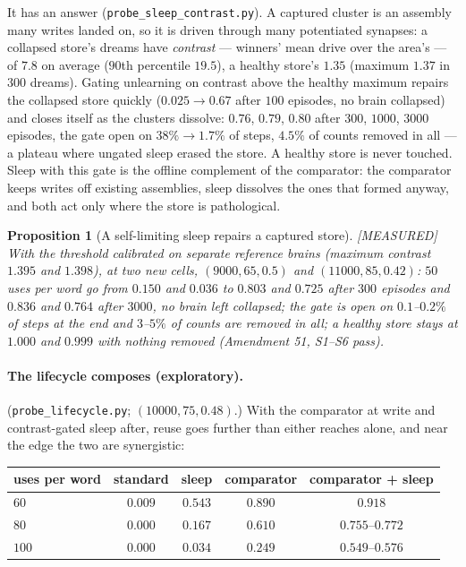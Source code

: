 \documentclass[11pt]{article}
\theoremstyle{definition}
\theoremstyle{plain}
\newtheorem{proposition}[lemma]{Proposition}
\newcommand{\MEASURED}{\textnormal{\footnotesize\textsf{[MEASURED]}}}
\begin{document}
It has an answer (\texttt{probe\_sleep\_contrast.py}). A captured cluster is an
assembly many writes landed on, so it is driven through many potentiated
synapses: a collapsed store's dreams have \emph{contrast} --- winners' mean drive
over the area's --- of $7.8$ on average ($90$th percentile $19.5$), a healthy
store's $1.35$ (maximum $1.37$ in $300$ dreams). Gating unlearning on contrast
above the healthy maximum repairs the collapsed store quickly ($0.025 \to 0.67$
after $100$ episodes, no brain collapsed) and closes itself as the clusters
dissolve: $0.76$, $0.79$, $0.80$ after $300$, $1000$, $3000$ episodes, the gate open
on $38\% \to 1.7\%$ of steps, $4.5\%$ of counts removed in all --- a plateau where
ungated sleep erased the store. A healthy store is never touched. Sleep with
this gate is the offline complement of the comparator: the comparator keeps
writes off existing assemblies, sleep dissolves the ones that formed anyway,
and both act only where the store is pathological.

\begin{proposition}[A self-limiting sleep repairs a captured store]\label{prop:sleep} \MEASURED
With the threshold calibrated on separate reference brains (maximum contrast
$1.395$ and $1.398$), at two new cells, $(9000,65,0.5)$ and $(11000,85,0.42)$:
$50$ uses per word go from $0.150$ and $0.036$ to $0.803$ and $0.725$ after $300$
episodes and $0.836$ and $0.764$ after $3000$, no brain left collapsed; the gate is
open on $0.1$--$0.2\%$ of steps at the end and $3$--$5\%$ of counts are removed in
all; a healthy store stays at $1.000$ and $0.999$ with nothing removed
(Amendment 51, S1--S6 pass).
\end{proposition}

\paragraph{The lifecycle composes (exploratory).} (\texttt{probe\_lifecycle.py};
$(10000,75,0.48)$.) With the comparator at write and contrast-gated sleep
after, reuse goes further than either reaches alone, and near the edge the two
are synergistic:

\begin{center}
\begin{tabular}{lcccc}
uses per word & standard & sleep & comparator & comparator + sleep \\
\hline
$60$  & $0.009$ & $0.543$ & $0.890$ & $0.918$ \\
$80$  & $0.000$ & $0.167$ & $0.610$ & $0.755$--$0.772$ \\
$100$ & $0.000$ & $0.034$ & $0.249$ & $0.549$--$0.576$ \\
\end{tabular}
\end{center}
\end{document}
